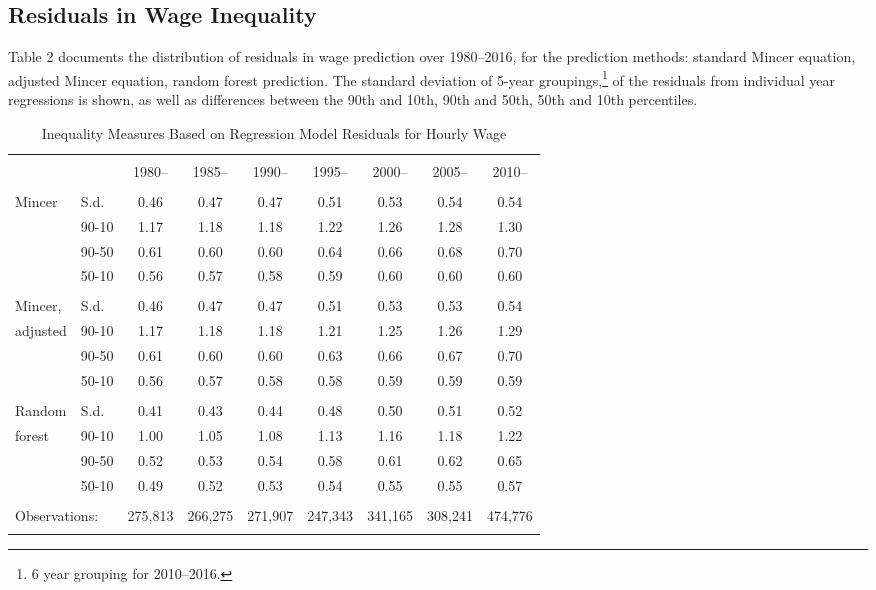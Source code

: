 \documentclass[notitlepage,12pt]{article}
\begin{document}
\subsection{Residuals in Wage Inequality}
Table 2 documents the distribution of residuals in wage prediction over 1980--2016, for the prediction methods: standard Mincer equation, adjusted Mincer equation, random forest prediction.  The standard deviation of 5-year groupings,\footnote{6 year grouping for 2010--2016.} of the residuals from individual year regressions is shown, as well as differences between the 90th and 10th, 90th and 50th, 50th and 10th percentiles.
\begin{table}[h]
\centering
\caption{Inequality Measures Based on Regression Model Residuals for Hourly Wage}
\begin{tabular}{@{\extracolsep{5pt}}ll|ccccccc} 
\\[-1.8ex]\hline 
\hline \\[-1.8ex] 
 & & 1980-- & 1985-- & 1990-- & 1995-- & 2000-- & 2005-- & 2010-- \\
\hline \\[-1.8ex] 
  Mincer & S.d. & 0.46 & 0.47 & 0.47 & 0.51 & 0.53 & 0.54 & 0.54 \\ 
   & 90-10 & 1.17 & 1.18 & 1.18 & 1.22 & 1.26 & 1.28 & 1.30 \\ 
   & 90-50 & 0.61 & 0.60 & 0.60 & 0.64 & 0.66 & 0.68 & 0.70 \\ 
   & 50-10 & 0.56 & 0.57 & 0.58 & 0.59 & 0.60 & 0.60 & 0.60 \\ \hline \\[-1.8ex] 
  Mincer, & S.d. & 0.46 & 0.47 & 0.47 & 0.51 & 0.53 & 0.53 & 0.54 \\
  adjusted & 90-10 & 1.17 & 1.18 & 1.18 & 1.21 & 1.25 & 1.26 & 1.29 \\ 
   & 90-50 & 0.61 & 0.60 & 0.60 & 0.63 & 0.66 & 0.67 & 0.70 \\ 
   & 50-10 & 0.56 & 0.57 & 0.58 & 0.58 & 0.59 & 0.59 & 0.59 \\ \hline \\[-1.8ex] 
  Random & S.d. & 0.41 & 0.43 & 0.44 & 0.48 & 0.50 & 0.51 & 0.52 \\ 
  forest & 90-10 & 1.00 & 1.05 & 1.08 & 1.13 & 1.16 & 1.18 & 1.22 \\ 
   & 90-50 & 0.52 & 0.53 & 0.54 & 0.58 & 0.61 & 0.62 & 0.65 \\ 
   & 50-10 & 0.49 & 0.52 & 0.53 & 0.54 & 0.55 & 0.55 & 0.57 \\ \hline \\[-1.8ex] 
  \multicolumn{2}{l}{Observations:}  & 275,813 & 266,275 & 271,907 & 247,343 & 341,165 & 308,241 & 474,776 \\ 
\hline 
\hline \\[-1.8ex] 
\end{tabular} 
\end{table}
\end{document}
